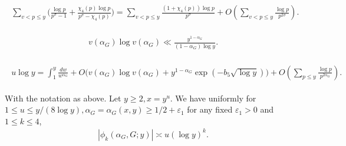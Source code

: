 \documentclass[10pt,a4paper]{amsart}
\begin{document}
\begin{align}
\label{sumpvy}
\begin{split}
  \sum_{v<p \leq y}\Big(\frac {\log p}{p^{\sigma}-1}+\frac {\chi_4(p)\log p}{p^{\sigma}-\chi_4(p)}\Big )=\sum_{v<p \leq y}\frac {(1+\chi_4(p)) \log p}{p^{\sigma}}+O(\sum_{v<p \leq y}\frac {\log p}{p^{2\sigma}}).
\end{split}
\end{align}   

\begin{align}
\label{vest}
\begin{split}
  v(\alpha_G)\log v(\alpha_G) \ll \frac {y^{1-\alpha_G}}{(1-\alpha_G)\log y}.
\end{split}
\end{align}   

\begin{align}
\label{sumpvy4}
\begin{split}
  u\log y =\int^{y}_1\frac {dw}{w^{\alpha_G}}+ O\Big(v(\alpha_G)\log v(\alpha_G)+y^{1-\alpha_G}\exp(-b_5\sqrt{\log y})\Big)+O(\sum_{p \leq y}\frac {\log p}{p^{2\alpha_G}}).
\end{split}
\end{align}  

\begin{lemma}
\label{lemphibound}
  With the notation as above. Let $y \geq 2, x=y^u$. We have uniformly for $1 \leq u \leq y/(8\log y), \alpha_G=\alpha_G(x,y) \geq 1/2+\varepsilon_1$ for any fixed $\varepsilon_1>0$ and $1 \leq k \leq 4$,
\begin{align}
\label{phikasymp}
  |\phi_k(\alpha_G,G;y)| \asymp u(\log y)^k. 
\end{align}
\end{lemma}  
\end{document}
